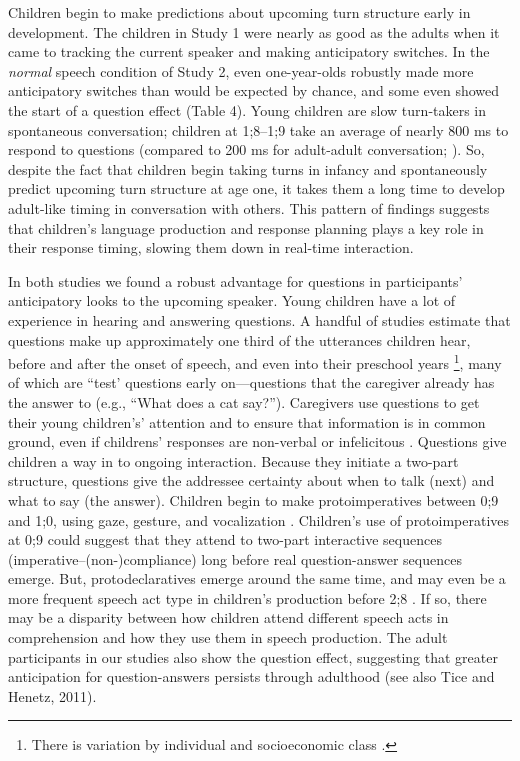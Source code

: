 \documentclass[authoryear, 12pt]{elsarticle}
\begin{document}
Children begin to make predictions about upcoming turn structure early in development. The children in Study 1 were nearly as good as the adults when it came to tracking the current speaker and making anticipatory switches. In the \textit{normal} speech condition of Study 2, even one-year-olds robustly made more anticipatory switches than would be expected by chance, and some even showed the start of a question effect (Table 4). Young children are slow turn-takers in spontaneous conversation; children at 1;8--1;9 take an average of nearly 800 ms to respond to questions (compared to 200 ms for adult-adult conversation; \citealp{casillasUndRev, stivers2009}). So, despite the fact that children begin taking turns in infancy and spontaneously predict upcoming turn structure at age one, it takes them a long time to develop adult-like timing in conversation with others. This pattern of findings suggests that children's language production and response planning plays a key role in their response timing, slowing them down in real-time interaction.

In both studies we found a robust advantage for questions in participants' anticipatory looks to the upcoming speaker. Young children have a lot of experience in hearing and answering questions. A handful of studies estimate that questions make up approximately one third of the utterances children hear, before and after the onset of speech, and even into their preschool years \citep{fitneva2012, henning2005, shatz1979}\footnote{There is variation by individual and socioeconomic class \citep{hart1992}.}, many of which are ``test' questions early on---questions that the caregiver already has the answer to (e.g., ``What does a cat say?''). Caregivers use questions to get their young children's' attention and to ensure that information is in common ground, even if childrens' responses are non-verbal or infelicitous \citep{fitneva2012, snow1977}. Questions give children a way in to ongoing interaction. Because they initiate a two-part structure, questions give the addressee certainty about when to talk (next) and what to say (the answer). Children begin to make protoimperatives between 0;9 and 1;0, using gaze, gesture, and vocalization \citep{bates1975}. Children's use of protoimperatives at 0;9 could suggest that they attend to two-part interactive sequences (imperative--(non-)compliance) long before real question-answer sequences emerge. But, protodeclaratives emerge around the same time, and may even be a more frequent speech act type in children's production before 2;8 \cite{cameron-faulkner2014}. If so, there may be a disparity between how children attend different speech acts in comprehension and how they use them in speech production. The adult participants in our studies also show the question effect, suggesting that greater anticipation for question-answers persists through adulthood (see also Tice and Henetz, 2011).
\end{document}
